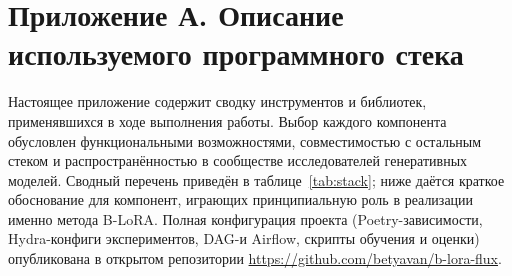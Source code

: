 
\appendix
\section*{Приложение А. Описание используемого программного стека}
\label{appendix:stack}

Настоящее приложение содержит сводку инструментов и библиотек, применявшихся
в ходе выполнения работы. Выбор каждого компонента обусловлен функциональными
возможностями, совместимостью с остальным стеком и распространённостью
в сообществе исследователей генеративных моделей. Сводный перечень приведён
в таблице~\ref{tab:stack}; ниже даётся краткое обоснование для компонент,
играющих принципиальную роль в реализации именно метода B-LoRA.
Полная конфигурация проекта (Poetry-зависимости, Hydra-конфиги экспериментов,
DAG-и Airflow, скрипты обучения и оценки) опубликована в открытом репозитории
\url{https://github.com/betyavan/b-lora-flux}.

